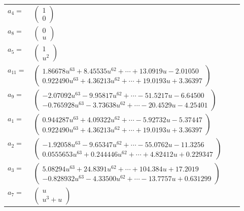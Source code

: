 \documentclass[1p]{elsarticle_modified}
\theoremstyle{definition}
\begin{document}
\begin{tabular}{m{7pt} m{180pt} m{7pt} m{180pt} }
\flushright $a_{4}=$&$\begin{pmatrix}1\\0\end{pmatrix}$ \\
\flushright $a_{8}=$&$\begin{pmatrix}0\\u\end{pmatrix}$ \\
\flushright $a_{5}=$&$\begin{pmatrix}1\\u^2\end{pmatrix}$ \\
\flushright $a_{11}=$&$\begin{pmatrix}1.86678 u^{63}+8.45535 u^{62}+\cdots+13.0919 u-2.01050\\0.922490 u^{63}+4.36213 u^{62}+\cdots+19.0193 u+3.36397\end{pmatrix}$ \\
\flushright $a_{9}=$&$\begin{pmatrix}-2.07092 u^{63}-9.95817 u^{62}+\cdots-51.5217 u-6.64500\\-0.765928 u^{63}-3.73638 u^{62}+\cdots-20.4529 u-4.25401\end{pmatrix}$ \\
\flushright $a_{1}=$&$\begin{pmatrix}0.944287 u^{63}+4.09322 u^{62}+\cdots-5.92732 u-5.37447\\0.922490 u^{63}+4.36213 u^{62}+\cdots+19.0193 u+3.36397\end{pmatrix}$ \\
\flushright $a_{2}=$&$\begin{pmatrix}-1.92058 u^{63}-9.65347 u^{62}+\cdots-55.0762 u-11.3256\\0.0555653 u^{63}+0.244446 u^{62}+\cdots+4.82412 u+0.229347\end{pmatrix}$ \\
\flushright $a_{3}=$&$\begin{pmatrix}5.08294 u^{63}+24.8391 u^{62}+\cdots+104.384 u+17.2019\\-0.828932 u^{63}-4.33500 u^{62}+\cdots-13.7757 u+0.631299\end{pmatrix}$ \\
\flushright $a_{7}=$&$\begin{pmatrix}u\\u^3+u\end{pmatrix}$ \\

\end{tabular}
\end{document}

